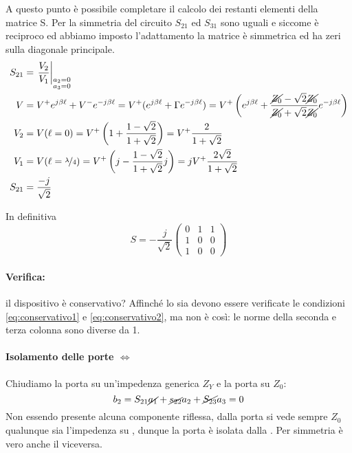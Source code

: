 A questo punto è possibile completare il calcolo dei restanti elementi della matrice S. Per la simmetria del circuito $S_{21}$ ed $S_{31}$ sono uguali e siccome è reciproco ed abbiamo imposto l'adattamento la matrice è simmetrica ed ha zeri sulla diagonale principale.
\begin{align*}
S_{21} &= \left. \frac{V_2}{V_1}\right|_{\substack{a_2 = 0\\ a_3=0}}
\\
V &= V^+ e^{j\beta\ell}+ V^- e^{-j\beta\ell} =
V^+ (e^{j\beta\ell}+\Gamma e^{-j\beta\ell})
=
V^+ \left(e^{j\beta\ell}+ \frac{\cancel{Z_0} - \sqrt{2} \cancel{Z_0}}{\cancel{Z_0} + \sqrt{2} \cancel{Z_0}} e^{-j\beta\ell}\right)
\\
V_2 &= V(\ell = 0) =
V^+ \left(1+\frac{1-\sqrt{2}}{1+\sqrt{2}}\right)
= V^+ \frac{2}{1+\sqrt{2}}
\\
V_1 &= V(\ell = \nicefrac{\lambda}{4}) = 
V^+ \left(j-\frac{1-\sqrt{2}}{1+\sqrt{2}}j\right)
= jV^+ \frac{2\sqrt{2}}{1+\sqrt{2}}
\\
S_{21} &= \frac{-j}{\sqrt{2}}
\end{align*}

In definitiva
\[
S = -\frac{j}{\sqrt{2}}\left(
\begin{array}{ccc}
0 &1&1\\
1 &0&0\\
1 &0&0
\end{array}
\right)
\]

\paragraph{Verifica:} il dispositivo è conservativo? 
Affinché lo sia devono essere verificate le condizioni \ref{eq:conservativo1} e \ref{eq:conservativo2}, ma non è così: le norme della seconda e terza colonna sono diverse da 1.

\paragraph{Isolamento delle porte  $\Leftrightarrow$ }
Chiudiamo la porta  su un'impedenza generica $Z_Y$ e la porta  su $Z_0$:
\[
b_2 = S_{21}\cancel{a_1} + \cancel{s_{22}}a_2 +\cancel{S_{23}}a_3 = 0
\]
Non essendo presente alcuna componente riflessa, dalla porta  si vede sempre $Z_0$ qualunque sia l'impedenza su , dunque la porta  è isolata dalla . Per simmetria è vero anche il viceversa.

